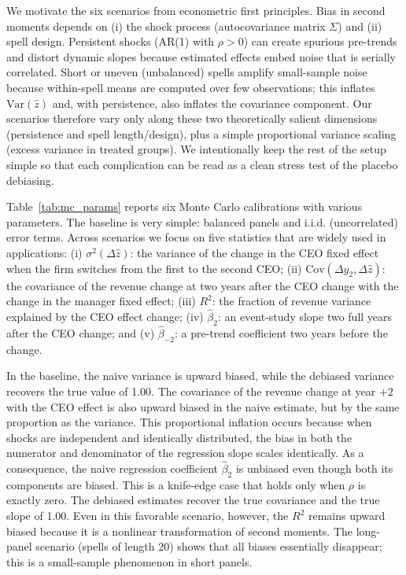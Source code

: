 \documentclass[11pt,a4paper]{article}
\newcommand{\Var}{\text{Var}}
\begin{document}
We motivate the six scenarios from econometric first principles. Bias in second moments depends on (i) the shock process (autocovariance matrix \(\Sigma\)) and (ii) spell design. Persistent shocks (AR(1) with \(\rho>0\)) can create spurious pre-trends and distort dynamic slopes because estimated effects embed noise that is serially correlated. Short or uneven (unbalanced) spells amplify small-sample noise because within-spell means are computed over few observations; this inflates \(\Var(\hat z)\) and, with persistence, also inflates the covariance component. Our scenarios therefore vary only along these two theoretically salient dimensions (persistence and spell length/design), plus a simple proportional variance scaling (excess variance in treated groups). We intentionally keep the rest of the setup simple so that each complication can be read as a clean stress test of the placebo debiasing.

Table~\ref{tab:mc_params} reports six Monte Carlo calibrations with various parameters. The baseline is very simple: balanced panels and i.i.d. (uncorrelated) error terms. Across scenarios we focus on five statistics that are widely used in applications: (i) $\sigma^2(\Delta \hat z)$: the variance of the change in the CEO fixed effect when the firm switches from the first to the second CEO; (ii) $ \mathrm{Cov}(\Delta y_2, \Delta \hat z)$: the covariance of the revenue change at two years after the CEO change with the change in the manager fixed effect; (iii) $ R^2$: the fraction of revenue variance explained by the CEO effect change; (iv) $\hat \beta_2$: an event-study slope two full years after the CEO change; and (v)  $\hat \beta_{-2}$: a pre-trend coefficient two years before the change.

In the baseline, the naive variance is upward biased, while the debiased variance recovers the true value of 1.00. The covariance of the revenue change at year $+2$ with the CEO effect is also upward biased in the naive estimate, but by the same proportion as the variance. This proportional inflation occurs because when shocks are independent and identically distributed, the bias in both the numerator and denominator of the regression slope scales identically. As a consequence, the naive regression coefficient $\hat\beta_2$ is unbiased even though both its components are biased. This is a knife-edge case that holds only when $\rho$ is exactly zero. The debiased estimates recover the true covariance and the true slope of 1.00. Even in this favorable scenario, however, the $R^2$ remains upward biased because it is a nonlinear transformation of second moments. The long-panel scenario (spells of length 20) shows that all biases essentially disappear; this is a small-sample phenomenon in short panels.
\end{document}
